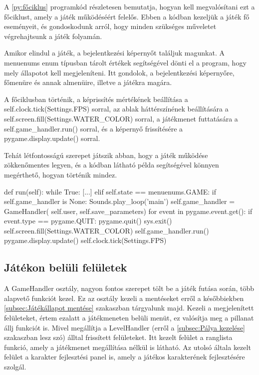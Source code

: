 A \ref{py:főciklus} programkód részletesen bemutatja, hogyan kell megvalósítani ezt a főciklust, amely a játék működéséért felelős. Ebben a kódban kezeljük a játék fő eseményeit, és gondoskodunk arról, hogy minden szükséges műveletet végrehajtsunk a játék folyamán.

Amikor elindul a játék, a bejelentkezési képernyőt találjuk magunkat. A menuenums enum típusban tárolt értékek segítségével dönti el a program, hogy mely állapotot kell megjeleníteni. Itt gondolok, a bejelentkezési képernyőre, főmenüre és annak almenüire, illetve a játékra magára. 

A főciklusban történik, a képrissítés mértékének beállítása a self.clock.tick(Settings.FPS) sorral, az ablak háttérszínének beállítására a self.screen.fill(Settings.WATER\_COLOR) sorral, a játékmenet futtatására a self.game\_handler.run() sorral, és a képernyő frissítésére a pygame.display.update() sorral.

Tehát létfontosságú szerepet játszik abban, hogy a játék működése zökkenőmentes legyen, és a kódban látható példa segítségével könnyen megérthető, hogyan történik mindez.


\begin{python}[caption={Játék főciklusa},label=py:főciklus]
    def run(self):
        while True:
            [...]
            elif self.state == menuenums.GAME:
                if self.game_handler is None:
                    Sounds.play_loop('main')
                    self.game_handler = GameHandler(
                        self.user, self.save_parameters)
                for event in pygame.event.get():
                    if event.type == pygame.QUIT:
                        pygame.quit()
                        sys.exit()
                self.screen.fill(Settings.WATER_COLOR)
                self.game_handler.run()
                pygame.display.update()
                self.clock.tick(Settings.FPS)
\end{python}

\subsection{Játékon belüli felületek} \label{subsec:A játék fő osztálya}
 A GameHandler osztály, nagyon fontos szerepet tölt be a játék futása során, több alapvető funkciót kezel. Ez az osztály kezeli a mentéseket erről a későbbiekben \ref{subsec:Játékállapot mentése} szakaszban tárgyalunk majd. 
Kezeli a megjelenített felületeket, értem ezalatt a játékmeneten belüli menüt, ez valósítja meg a pillanat állj funkciót is. Mivel megállítja a LevelHandler (erről a \ref{subsec:Pálya kezelése} szakaszban lesz szó) álltal frissített felületeket. Itt kezelt felület a ranglista funkció, amely a játékmenet megállítása nélkül is látható. Az utolsó általa kezelt felület a karakter fejlesztési panel is, amely a játékos karakterének fejlesztésére szolgál.

